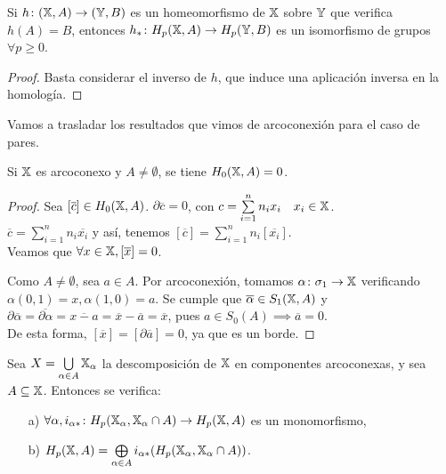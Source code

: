 \begin{corollary}
  Si $h \colon ({\mathbb X}, A) \to ({\mathbb Y}, B)$ es un homeomorfismo de ${\mathbb X}$ sobre ${\mathbb Y}$ que verifica $h(A) = B$, entonces
  $h_* \colon H_p({\mathbb X}, A) \to H_p({\mathbb Y}, B)$ es un isomorfismo de grupos $\forall p \geq 0$.
\end{corollary}

\begin{proof}
  Basta considerar el inverso de $h$, que induce una aplicación inversa en la homología.
\end{proof}

Vamos a trasladar los resultados que vimos de arcoconexión para el caso de pares.

\begin{proposition}
  Si ${\mathbb X}$ es arcoconexo y $A \neq \emptyset$, se tiene $H_0({\mathbb X}, A) = 0$.
\end{proposition}

\begin{proof}
  Sea $[\overline{c}] \in H_0({\mathbb X}, A)$. $\partial\overline{c} = 0$, con $c = \sum\limits_{i = 1}^n n_i x_i \quad x_i \in {\mathbb X}$. \\
  $\overline{c} = \sum\limits_{i = 1}^n n_i \overline{x_i}$ y así, tenemos $[\overline{c}] = \sum\limits_{i = 1}^n n_i [\overline{x_i}]$. \\
  Veamos que $\forall x \in {\mathbb X}, [\overline{x}] = 0$.

  Como $A \neq \emptyset$, sea $a \in A$. Por arcoconexión, tomamos $\alpha \colon \sigma_1 \to {\mathbb X}$ verificando $\alpha(0, 1) = x, \alpha(1, 0) = a$.
  Se cumple que $\overline{\alpha} \in S_1({\mathbb X}, A)$ y $\partial\overline{\alpha} = \overline{\partial\alpha} = \overline{x - a} = \overline{x} - \overline{a}
  = \overline{x}$, pues $a \in S_0(A) \implies \overline{a} = 0$. \\
  De esta forma, $[\overline{x}] = [\partial\overline{a}] = 0$, ya que es un borde.
\end{proof}

\begin{proposition}
  Sea $X = \bigcup\limits_{\alpha \in A} {\mathbb X}_\alpha$ la descomposición de ${\mathbb X}$ en componentes arcoconexas, y sea $A \subseteq {\mathbb X}$. Entonces se verifica:
  \begin{itemize}
    \item[a)] $\forall \alpha, i_{\alpha *} \colon H_p({\mathbb X}_\alpha, {\mathbb X}_\alpha \cap A) \to H_p({\mathbb X}, A)$ es un monomorfismo,
    \item[b)] $H_p({\mathbb X}, A) = \bigoplus\limits_{\alpha \in A}  i_{\alpha *}(H_p({\mathbb X}_\alpha, {\mathbb X}_\alpha \cap A))$.
  \end{itemize}
\end{proposition}

